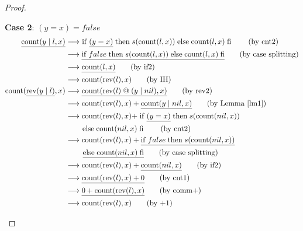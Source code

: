 \documentclass[12pt, a4paper]{article}
\newcommand{\rel}[1]{\mathrel{#1}}
\newcommand{\rmx}[1]{\mathrm{#1}}
\newcommand{\larrow}{\longrightarrow}
\newcommand{\under}{\underline}
\begin{document}
\begin{proof}
\begin{description}
\textbf{Case 2}: $(y = x) = false$
\begin{align*}
\under{\rmx{count}(y \mid l, x)}
	&\larrow\ \rel{\rmx{if}} \under{(y = x)} \rel{\rmx{then}} s(\rmx{count}(l, x)) \rel{\rmx{else}} \rmx{count}(l, x) \rel{\rmx{fi}} \tag{by cnt2} \\
	&\larrow \under{\rel{\rmx{if}} false \rel{\rmx{then}} s(\rmx{count}(l, x)) \rel{\rmx{else}} \rmx{count}(l, x) \rel{\rmx{fi}}} \tag{by case splitting} \\
	&\larrow \under{\rmx{count}(l, x)} \tag{by if2} \\
	&\larrow \rmx{count}(\rmx{rev}(l), x) \tag{by IH} \\
\rmx{count}(\under{\rmx{rev}(y \mid l)}, x)
	&\larrow \under{\rmx{count}(\rmx{rev}(l) \rel{@} (y \mid nil), x)} \tag{by rev2} \\
	&\larrow \rmx{count}(\rmx{rev}(l), x) +  \under{\rmx{count}(y \mid nil, x)} \tag{by Lemma~\ref{lm1}} \\
	&\larrow \rmx{count}(\rmx{rev}(l), x) + \rel{\rmx{if}} \under{(y = x)} \rel{\rmx{then}} s(\rmx{count}(nil, x)) \\
	&\quad \quad \rel{\rmx{else}} \rmx{count}(nil, x) \rel{\rmx{fi}} \tag{by cnt2} \\
	&\larrow \rmx{count}(\rmx{rev}(l), x) + \under{\rel{\rmx{if}} false \rel{\rmx{then}} s(\rmx{count}(nil, x))} \\
	&\quad \quad\ \under{\rel{\rmx{else}} \rmx{count}(nil, x) \rel{\rmx{fi}}} \tag{by case splitting} \\
	&\larrow \rmx{count}(\rmx{rev}(l), x) + \under{\rmx{count}(nil, x)} \tag{by if2} \\
	&\larrow \under{\rmx{count}(\rmx{rev}(l), x) + 0} \tag{by cnt1} \\
	&\larrow \under{0 + \rmx{count}(\rmx{rev}(l), x)} \tag{by comm+} \\
	&\larrow \rmx{count}(\rmx{rev}(l), x) \tag{by +1}
\end{align*}
\end{description}

\end{proof}
\end{document}
